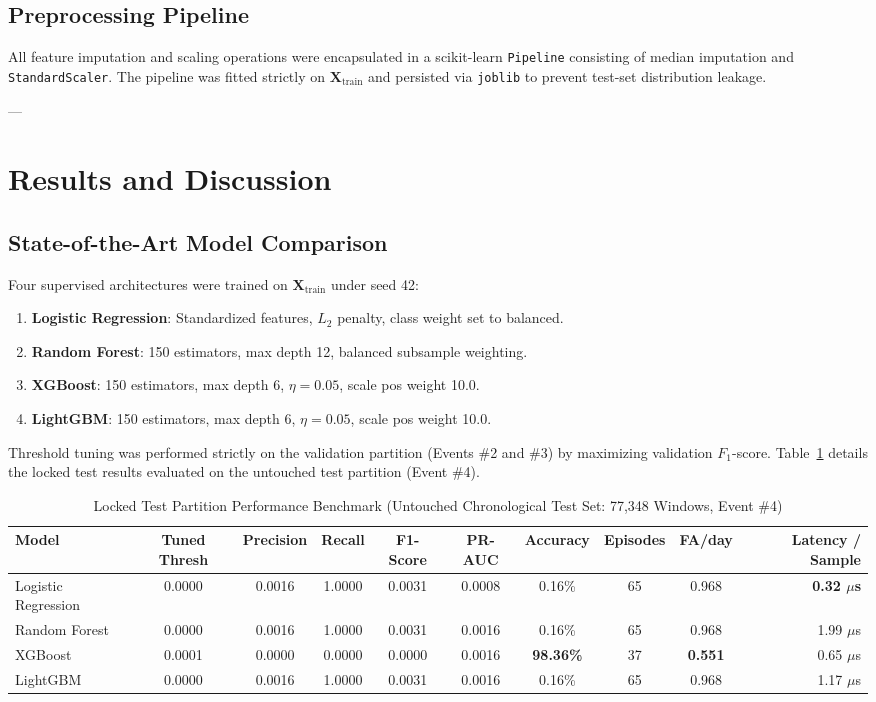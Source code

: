 \documentclass[10pt,twocolumn,a4paper]{article}
\begin{document}
\subsection{Preprocessing Pipeline}
All feature imputation and scaling operations were encapsulated in a scikit-learn \texttt{Pipeline} consisting of median imputation and \texttt{StandardScaler}. The pipeline was fitted strictly on $\mathbf{X}_{\text{train}}$ and persisted via \texttt{joblib} to prevent test-set distribution leakage.

---

\section{Results and Discussion}

\subsection{State-of-the-Art Model Comparison}
Four supervised architectures were trained on $\mathbf{X}_{\text{train}}$ under seed 42:
\begin{enumerate}
    \item \textbf{Logistic Regression}: Standardized features, $L_2$ penalty, class weight set to balanced.
    \item \textbf{Random Forest}: 150 estimators, max depth 12, balanced subsample weighting.
    \item \textbf{XGBoost}: 150 estimators, max depth 6, $\eta = 0.05$, scale pos weight 10.0.
    \item \textbf{LightGBM}: 150 estimators, max depth 6, $\eta = 0.05$, scale pos weight 10.0.
\end{enumerate}

Threshold tuning was performed strictly on the validation partition (Events \#2 and \#3) by maximizing validation $F_1$-score. Table~\ref{tab:test_results} details the locked test results evaluated on the untouched test partition (Event \#4).

\begin{table}[t]
\centering
\caption{Locked Test Partition Performance Benchmark (Untouched Chronological Test Set: 77,348 Windows, Event \#4)}
\label{tab:test_results}
\small
\begin{tabular}{lccccccccr}
\toprule
\textbf{Model} & \textbf{Tuned Thresh} & \textbf{Precision} & \textbf{Recall} & \textbf{F1-Score} & \textbf{PR-AUC} & \textbf{Accuracy} & \textbf{Episodes} & \textbf{FA/day} & \textbf{Latency / Sample} \\
\midrule
Logistic Regression & 0.0000 & 0.0016 & 1.0000 & 0.0031 & 0.0008 & 0.16\% & 65 & 0.968 & \textbf{0.32 $\mu$s} \\
Random Forest & 0.0000 & 0.0016 & 1.0000 & 0.0031 & 0.0016 & 0.16\% & 65 & 0.968 & 1.99 $\mu$s \\
XGBoost & 0.0001 & 0.0000 & 0.0000 & 0.0000 & 0.0016 & \textbf{98.36\%} & 37 & \textbf{0.551} & 0.65 $\mu$s \\
LightGBM & 0.0000 & 0.0016 & 1.0000 & 0.0031 & 0.0016 & 0.16\% & 65 & 0.968 & 1.17 $\mu$s \\
\bottomrule
\end{tabular}
\end{table}
\end{document}

